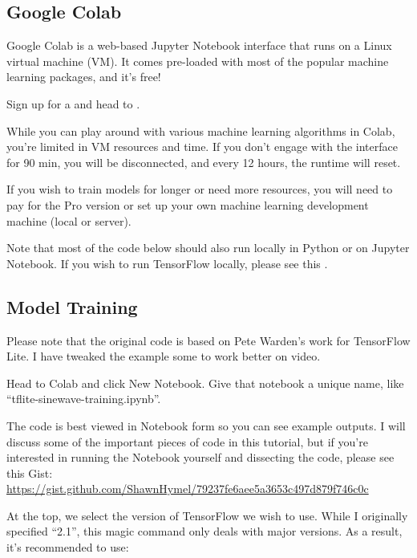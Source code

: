 \subsection{Google Colab}

Google Colab is a web-based Jupyter Notebook interface that runs on a Linux virtual machine (VM). It comes pre-loaded with most of the popular machine learning packages, and it's free!

Sign up for a  and head to .

While you can play around with various machine learning algorithms in Colab, you're limited in VM resources and time. If you don’t engage with the interface for 90 min, you will be disconnected, and every 12 hours, the runtime will reset.

If you wish to train models for longer or need more resources, you will need to pay for the Pro version or set up your own machine learning development machine (local or server).

Note that most of the code below should also run locally in Python or on Jupyter Notebook. If you wish to run TensorFlow locally, please see this .

\subsection{Model Training}

Please note that the original code is based on Pete Warden’s work for TensorFlow Lite. I have tweaked the example some to work better on video.

Head to Colab and click New Notebook. Give that notebook a unique name, like ``tflite-sinewave-training.ipynb''. 

The code is best viewed in Notebook form so you can see example outputs. I will discuss some of the important pieces of code in this tutorial, but if you’re interested in running the Notebook yourself and dissecting the code, please see this Gist: \url{https://gist.github.com/ShawnHymel/79237fe6aee5a3653c497d879f746c0c}

At the top, we select the version of TensorFlow we wish to use. While I originally specified ``2.1'', this magic command only deals with major versions. As a result, it’s recommended to use:

